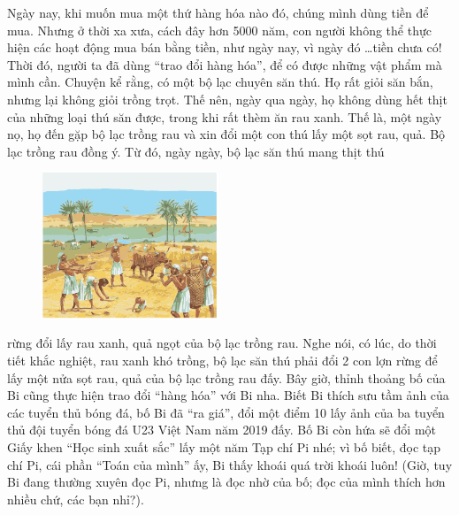 	Ngày nay, khi muốn mua một thứ hàng hóa nào đó, chúng mình dùng tiền để mua. Nhưng ở thời xa xưa, cách đây hơn 5000 năm, con người không thể thực hiện các hoạt động mua bán bằng tiền, như ngày nay, vì ngày đó \ldots tiền chưa có! Thời đó, người ta đã dùng “trao đổi hàng hóa”, để có được những vật phẩm mà mình cần. Chuyện kể rằng, có một bộ lạc chuyên săn thú. Họ rất giỏi săn bắn, nhưng lại không giỏi trồng trọt. Thế nên, ngày qua ngày, họ không dùng hết thịt của những loại thú săn được, trong khi rất thèm ăn rau xanh. Thế là, một ngày nọ, họ đến gặp bộ lạc trồng rau và xin đổi một con thú lấy một sọt rau, quả. Bộ lạc trồng rau đồng ý. Từ đó, ngày ngày, bộ lạc săn thú mang thịt thú
	\begin{figure}[H]
		\centering
		\vspace*{-5pt}
		\captionsetup{labelformat= empty, justification=centering}
		\includegraphics[width=0.47\textwidth]{pic2}
		\vspace*{-10pt}
	\end{figure}
	rừng đổi lấy rau xanh, quả ngọt của bộ lạc trồng rau. Nghe nói, có lúc, do thời tiết khắc nghiệt, rau xanh khó trồng, bộ lạc săn thú phải đổi 2 con lợn rừng để lấy một nửa sọt rau, quả của bộ lạc trồng rau đấy.
	\vskip 0.15cm	
	Bây giờ, thỉnh thoảng bố của Bi cũng thực hiện trao đổi “hàng hóa” với Bi nha. Biết Bi thích sưu tầm ảnh của các tuyển thủ bóng đá, bố Bi đã “ra giá”, đổi một điểm 10 lấy ảnh của ba tuyển thủ đội tuyển bóng đá U23 Việt Nam năm 2019 đấy. Bố Bi còn hứa sẽ đổi một Giấy khen “Học sinh xuất sắc” lấy một năm Tạp chí Pi nhé; vì bố biết, đọc tạp chí Pi, cái phần “Toán của  mình” ấy, Bi thấy khoái quá trời khoái luôn! (Giờ, tuy Bi đang thường xuyên đọc Pi, nhưng là đọc nhờ của bố; đọc của mình thích hơn nhiều chứ, các bạn nhỉ?).
